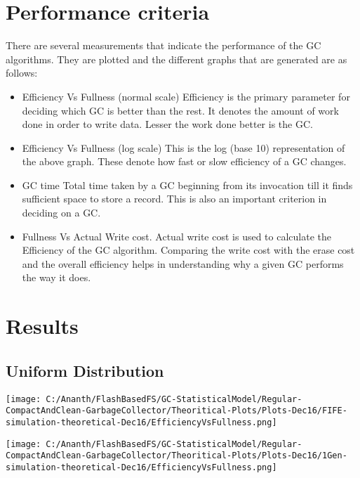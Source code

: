 \section{Performance criteria}
	There are several measurements that indicate the performance of the GC algorithms. They are plotted and the different graphs that are generated are as follows:
\begin{itemize}
\item Efficiency Vs Fullness (normal scale)
\subitem Efficiency is the primary parameter for deciding which GC is better than the rest. It denotes the amount of work done in order to write data. Lesser the work done better is the GC.
\item Efficiency Vs Fullness (log scale)
\subitem This is the log (base 10) representation of the above graph. These denote how fast or slow efficiency of a GC changes. 
\item GC time
\subitem Total time taken by a GC beginning from its invocation till it finds sufficient space to store a record. This is also an important criterion in deciding on a GC.
\item Fullness Vs Actual Write cost.
\subitem Actual write cost is used to calculate the Efficiency of the GC algorithm. Comparing the write cost with the erase cost and the overall efficiency helps in understanding why a given GC performs the way it does.
\end{itemize}


\section{Results}

\subsection{Uniform Distribution}

\begin{SCfigure}
	\centering
	\texttt{[image: C:/Ananth/FlashBasedFS/GC-StatisticalModel/Regular-CompactAndClean-GarbageCollector/Theoritical-Plots/Plots-Dec16/FIFE-simulation-theoretical-Dec16/EfficiencyVsFullness.png]}
\end{SCfigure}

\begin{SCfigure}
	\texttt{[image: C:/Ananth/FlashBasedFS/GC-StatisticalModel/Regular-CompactAndClean-GarbageCollector/Theoritical-Plots/Plots-Dec16/1Gen-simulation-theoretical-Dec16/EfficiencyVsFullness.png]}
\end{SCfigure}

